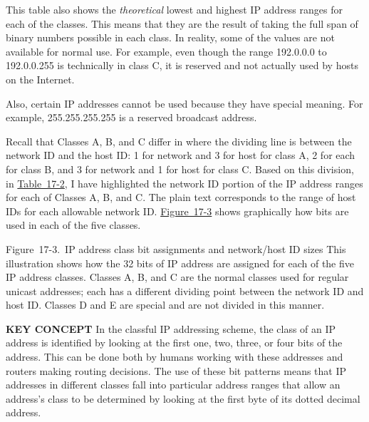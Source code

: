 \documentclass[b5paper,11pt]{memoir}
\begin{document}
This table also shows the {\emph{theoretical}} lowest and highest IP
address ranges for each of the classes. This means that they are the
result of taking the full span of binary numbers possible in each class.
In reality, some of the values are not available for normal use. For
example, even though the range 192.0.0.0 to 192.0.0.255 is technically
in class C, it is reserved and not actually used by hosts on the
Internet.

Also, certain IP addresses cannot be used because they have special
meaning. For example, 255.255.255.255 is a reserved broadcast address.

Recall that Classes A, B, and C differ in where the dividing line is
between the network ID and the host ID: 1 for network and 3 for host for
class A, 2 for each for class B, and 3 for network and 1 for host for
class C. Based on this division, in
\protect\hyperlink{ch17s02.htmlux5cux23ip_address_class_bit_patterns_first-octe}{Table~17-2},
I have highlighted the network ID portion of the IP address ranges for
each of Classes A, B, and C. The plain text corresponds to the range of
host IDs for each allowable network ID.
\protect\hyperlink{ch17s02.htmlux5cux23ip_address_class_bit_assignments_and_net}{Figure~17-3}
shows graphically how bits are used in each of the five classes.

\protect\hypertarget{ch17s02.htmlux5cux23ip_address_class_bit_assignments_and_net}{}{}

\protect\hypertarget{ch17s02.htmlux5cux23I_mediaobject3_d1e16900}{}{}

Figure~17-3.~IP address class bit assignments and network/host ID sizes
This illustration shows how the 32 bits of IP address are assigned for
each of the five IP address classes. Classes A, B, and C are the normal
classes used for regular unicast addresses; each has a different
dividing point between the network ID and host ID. Classes D and E are
special and are not divided in this manner.


{\textbf{KEY CONCEPT}} In the classful IP addressing scheme, the class
of an IP address is identified by looking at the first one, two, three,
or four bits of the address. This can be done both by humans working
with these addresses and routers making routing decisions. The use of
these bit patterns means that IP addresses in different classes fall
into particular address ranges that allow an address's class to be
determined by looking at the first byte of its dotted decimal
address.\protect\hypertarget{ch17s02.htmlux5cux23idx-CHP-17-0693}{}{}
\end{document}
